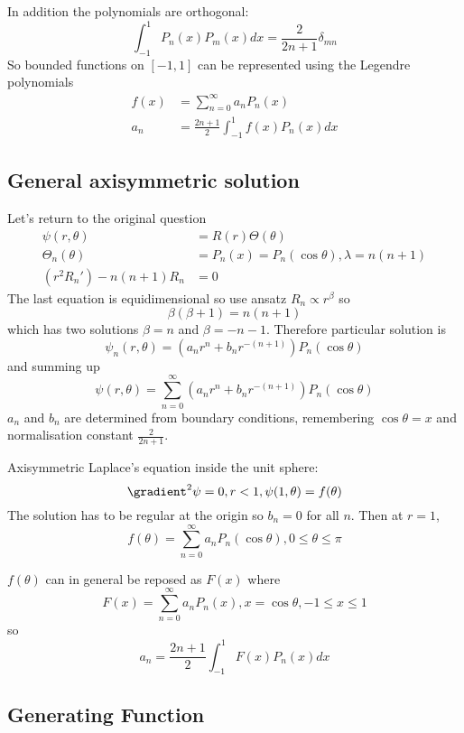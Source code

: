 \documentclass[a4paper]{article}
\newcommand*{\grad}{\gradient}
\newcommand*{\laplace}{\grad^2}
\newcommand*{\lap}{\laplace}
\begin{document}
In addition the polynomials are orthogonal:
\[
  \int_{-1}^{1} P_n(x) P_m(x) dx = \frac{2}{2n + 1} \delta_{mn}
\]
So bounded functions on \([-1, 1]\) can be represented using the Legendre polynomials
\begin{align*}
  f(x) &= \sum_{n = 0}^{\infty} a_n P_n(x) \\
  a_n &=  \frac{2n + 1}{2} \int_{-1}^{1}  f(x) P_n(x) dx
\end{align*}

\subsection{General axisymmetric solution}

Let's return to the original question
\begin{align*}
  \psi(r, \theta) &= R(r) \Theta(\theta) \\
  \Theta_n(\theta) &= P_n(x) = P_n(\cos \theta), \lambda = n(n + 1) \\
  (r^2 R_n') - n(n + 1) R_n &= 0
\end{align*}
The last equation is equidimensional so use ansatz \(R_n \propto r^\beta\) so
\[
  \beta(\beta + 1) = n(n + 1)
\]
which has two solutions \(\beta = n\) and \(\beta = -n - 1\). Therefore particular solution is
\[
  \psi_n(r, \theta) = (a_nr^n + b_n r^{-(n + 1)}) P_n(\cos \theta)
\]
and summing up
\[
  \psi(r, \theta) = \sum_{n = 0}^{\infty} (a_nr^n + b_n r^{-(n + 1)}) P_n(\cos \theta)
\]
\(a_n\) and \(b_n\) are determined from boundary conditions, remembering \(\cos \theta = x\) and normalisation constant \(\frac{2}{2n +1}\).

\begin{eg}
  Axisymmetric Laplace's equation inside the unit sphere:
  \[
    \lap \psi = 0, r < 1, \psi(1, \theta) = f(\theta)
  \]
  The solution has to be regular at the origin so \(b_n = 0\) for all \(n\). Then at \(r = 1\),
  \[
    f(\theta) = \sum_{n = 0}^{\infty} a_n P_n(\cos \theta), 0 \leq \theta \leq \pi
  \]

  \(f(\theta)\) can in general be reposed as \(F(x)\) where
  \[
    F(x) = \sum_{n = 0}^{\infty} a_n P_n(x), x = \cos \theta, -1 \leq x \leq 1
  \]
  so
  \[
    a_ n = \frac{2n + 1}{2} \int_{-1}^{1} F(x) P_n(x) dx
  \]
\end{eg}

\subsection{Generating Function}
\end{document}
